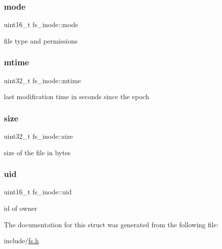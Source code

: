 \subsubsection{\texorpdfstring{mode}{mode}}
{\footnotesize\ttfamily uint16\+\_\+t fs\+\_\+inode\+::mode}

file type and permissions \mbox{\label{structfs__inode_ab11566bfc13bcd9f7cf24121447b0cfd}} 
\subsubsection{\texorpdfstring{mtime}{mtime}}
{\footnotesize\ttfamily uint32\+\_\+t fs\+\_\+inode\+::mtime}

last modification time in seconds since the epoch \mbox{\label{structfs__inode_ac10de2ad4b7c87da65fc17b5674b5759}} 
\subsubsection{\texorpdfstring{size}{size}}
{\footnotesize\ttfamily uint32\+\_\+t fs\+\_\+inode\+::size}

size of the file in bytes \mbox{\label{structfs__inode_ada0d9d68adb122d7e83558a1b8f683ec}} 
\subsubsection{\texorpdfstring{uid}{uid}}
{\footnotesize\ttfamily uint16\+\_\+t fs\+\_\+inode\+::uid}

id of owner 

The documentation for this struct was generated from the following file\+:\begin{DoxyCompactItemize}
\item 
include/\mbox{\hyperlink{fs_8h}{fs.\+h}}\end{DoxyCompactItemize}
